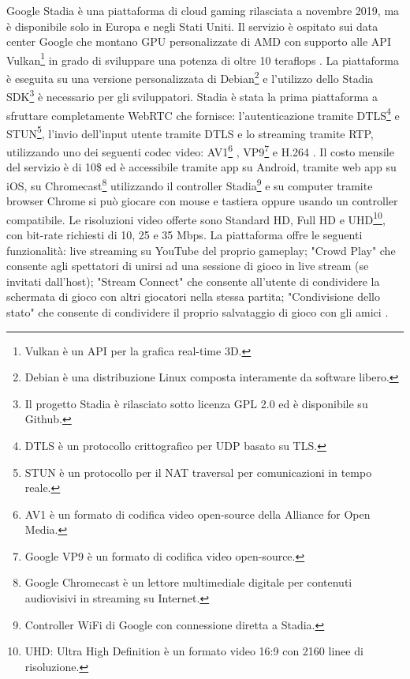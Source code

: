 Google Stadia è una piattaforma di cloud gaming rilasciata a novembre 2019, ma è disponibile solo in Europa e negli Stati Uniti. Il servizio è ospitato sui data center Google che montano GPU personalizzate di AMD \parencite{Google_Stadia_GPU} con supporto alle API Vulkan\footnote{Vulkan è un API per la grafica real-time 3D.} in grado di sviluppare una potenza di oltre 10 teraflops \parencite{Google_Stadia_Server}. La piattaforma è eseguita su una versione personalizzata di Debian\footnote{Debian è una distribuzione Linux composta interamente da software libero.} e l'utilizzo dello Stadia SDK\footnote{Il progetto Stadia è rilasciato sotto licenza GPL 2.0 ed è disponibile su Github.} è necessario per gli sviluppatori. Stadia è stata la prima piattaforma a sfruttare completamente WebRTC che fornisce: l'autenticazione tramite DTLS\footnote{DTLS è un protocollo crittografico per UDP basato su TLS.} e STUN\footnote{STUN è un protocollo per il NAT traversal per comunicazioni in tempo reale.}, l'invio dell'input utente tramite DTLS e lo streaming tramite RTP, utilizzando uno dei seguenti codec video: AV1\footnote{AV1 è un formato di codifica video open-source della Alliance for Open Media.} , VP9\footnote{Google VP9 è un formato di codifica video open-source.} e H.264 \parencite{A_Network_Analysis_on_Cloud_Gaming_Stadia_GeForce_Now_and_PSNow}. Il costo mensile del servizio è di 10\$ ed è accessibile tramite app su Android, tramite web app su iOS, su Chromecast\footnote{Google Chromecast è un lettore multimediale digitale per contenuti audiovisivi in streaming su Internet.} utilizzando il controller Stadia\footnote{Controller WiFi di Google con connessione diretta a Stadia.} e su computer tramite browser Chrome si può giocare con mouse e tastiera oppure usando un controller compatibile. Le risoluzioni video offerte sono Standard HD, Full HD e UHD\footnote{UHD: Ultra High Definition è un formato video 16:9 con 2160 linee di risoluzione.}, con bit-rate richiesti di 10, 25 e 35 Mbps. La piattaforma offre le seguenti funzionalità: live streaming su YouTube del proprio gameplay; "Crowd Play" che consente agli spettatori di unirsi ad una sessione di gioco in live stream (se invitati dall'host); "Stream Connect" che consente all'utente di condividere la schermata di gioco con altri giocatori nella stessa partita; "Condivisione dello stato" che consente di condividere il proprio salvataggio di gioco con gli amici \parencite{Google_Stadia}.

